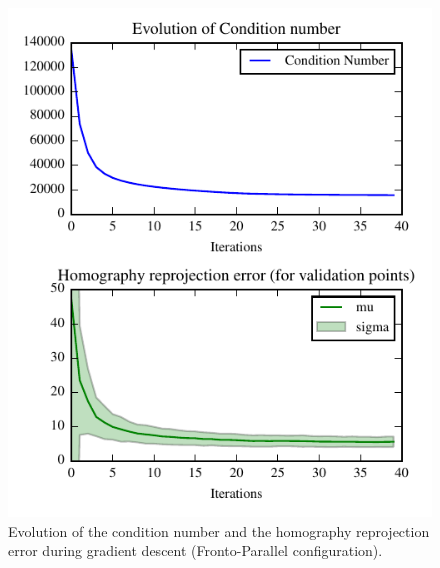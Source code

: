 \documentclass[letterpaper, 10 pt, conference]{ieeeconf}  %
\begin{document}
\begin{figure}[t]
  \begin{center}
    \showthe\columnwidth %
    \includegraphics[width=\columnwidth]{img/homography_fronto_parallel.pdf}
    \caption{\label{fig:homography_results} Evolution of the condition number and the homography reprojection error during gradient descent (Fronto-Parallel configuration).}
  \end{center}
\end{figure}
\end{document}
